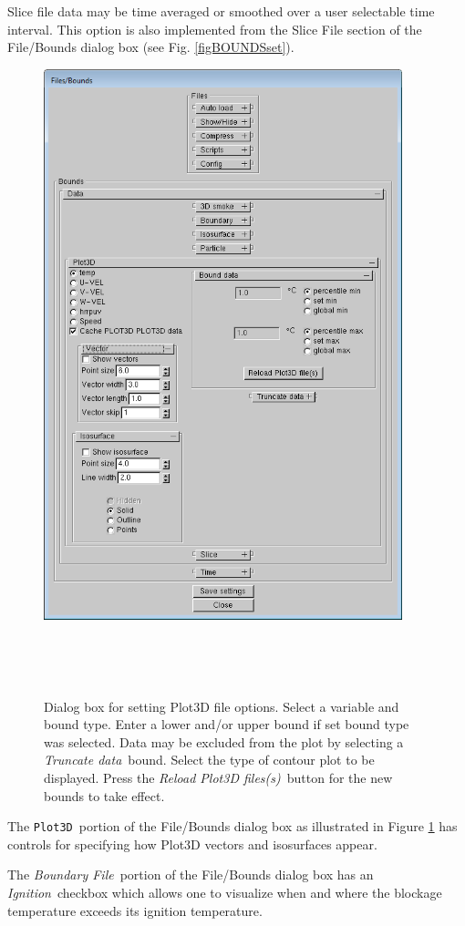 \documentclass[11pt,twoside]{book}
\begin{document}
Slice file data may be time averaged or smoothed over a user
selectable time interval.  This option is also implemented from
the Slice File section of the File/Bounds dialog box (see
Fig. \ref{figBOUNDSset}).

\begin{figure}[bph]
\centerline{
\includegraphics[width=4.0972222in]{FIGURES/figBOUNDSplot3d}
}\ \caption[Dialog box for setting Plot3D file
options.] {Dialog box for setting Plot3D file
options. Select a variable and bound type. Enter a lower
and/or upper bound if set bound type was selected.  Data may be excluded from the plot by
selecting a {\em Truncate data}\ bound. Select the type of contour
plot to be displayed. Press the {\em Reload Plot3D files(s)}\ button for
the new bounds to take effect.}\ \label{figBOUNDSplot3d}
\end{figure}

The {\tt Plot3D}\ portion of the File/Bounds dialog box as illustrated in Figure \ref{figBOUNDSplot3d} has controls for specifying how Plot3D vectors and isosurfaces appear.


The {\em Boundary File}\ portion of the File/Bounds dialog
box has an {\em Ignition}\ checkbox which allows one to visualize
when and where the blockage temperature exceeds its ignition
temperature.
\end{document}
